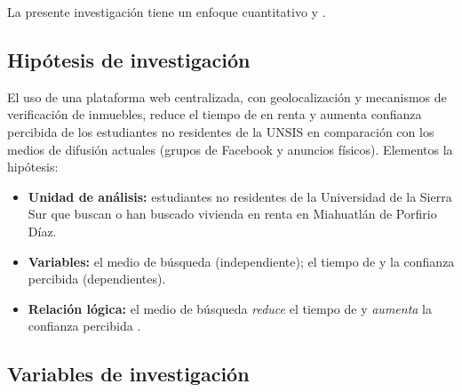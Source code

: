 La presente investigación tiene un enfoque cuantitativo y  \parencite{HernandezSampieri2018}.

\subsection{Hipótesis de investigación}

El uso de una plataforma web centralizada, con geolocalización y mecanismos de verificación de inmuebles, reduce el tiempo de  en renta y aumenta  confianza percibida  de los estudiantes no residentes de la UNSIS en comparación con los medios de difusión actuales (grupos de Facebook y anuncios físicos). Elementos  la hipótesis:

\begin{itemize}
    \item \textbf{Unidad de análisis:} estudiantes no residentes de la Universidad de la Sierra Sur que buscan o han buscado vivienda en renta en Miahuatlán de Porfirio Díaz.
    \item \textbf{Variables:} el medio de búsqueda (independiente); el tiempo de  y la confianza percibida  (dependientes).
    \item \textbf{Relación lógica:} el medio de búsqueda \emph{reduce} el tiempo de  y \emph{aumenta} la confianza percibida .
\end{itemize}

\subsection{Variables de investigación}


